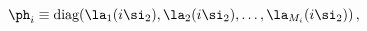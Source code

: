 \begin{equation}
\ph_i \equiv {\mbox {diag}} (\la_1 (i\si_2), \la_2 (i\si_2),\ldots , \la%
_{M_i}(i\si_2))\, ,  \label{DIA}
\end{equation}

